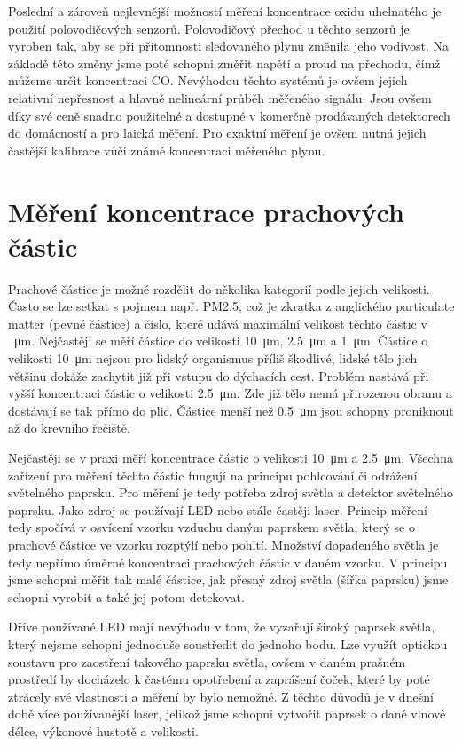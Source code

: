 Poslední a zároveň nejlevnější možností měření koncentrace oxidu uhelnatého je použití polovodičových senzorů. Polovodičový přechod u těchto senzorů je vyroben tak, aby se při přítomnosti sledovaného plynu změnila jeho vodivost. Na základě této změny jsme poté schopni změřit napětí a proud na přechodu, čímž můžeme určit koncentraci CO. Nevýhodou těchto systémů je ovšem jejich relativní nepřesnost a hlavně nelineární průběh měřeného signálu. Jsou ovšem díky své ceně snadno použitelné a dostupné v komerčně prodávaných detektorech do domácností a pro laická měření. Pro exaktní měření je ovšem nutná jejich častější kalibrace vůči známé koncentraci měřeného plynu.

\section{Měření koncentrace prachových částic}

Prachové částice je možné rozdělit do několika kategorií podle jejich velikosti. Často se lze setkat s pojmem např. PM2.5, což je zkratka z anglického particulate matter (pevné částice) a číslo, které udává maximální velikost těchto částic v \SI{}{\micro\metre}. Nejčastěji se měří částice do velikosti \SI{10}{\micro\metre}, \SI{2,5}{\micro\metre} a \SI{1}{\micro\metre}. Částice o velikosti \SI{10}{\micro\metre} nejsou pro lidský organismus příliš škodlivé, lidské tělo jich většinu dokáže zachytit již při vstupu do dýchacích cest. Problém nastává při vyšší koncentraci částic o velikosti \SI{2,5}{\micro\metre}. Zde již tělo nemá přirozenou obranu a dostávají se tak přímo do plic. Částice menší než \SI{0,5}{\micro\metre} jsou schopny proniknout až do krevního řečiště.

Nejčastěji se v praxi měří koncentrace částic o velikosti \SI{10}{\micro\metre} a \SI{2,5}{\micro\metre}. Všechna zařízení pro měření těchto částic fungují na principu pohlcování či odrážení světelného paprsku. Pro měření je tedy potřeba zdroj světla a detektor světelného paprsku. Jako zdroj se používají LED nebo stále častěji laser. Princip měření tedy spočívá v osvícení vzorku vzduchu daným paprskem světla, který se o prachové částice ve vzorku rozptýlí nebo pohltí. Množství dopadeného světla je tedy nepřímo úměrné koncentraci prachových částic v daném vzorku. V principu jsme schopni měřit tak malé částice, jak přesný zdroj světla (šířka paprsku) jsme schopni vyrobit a také jej potom detekovat.

Dříve používané LED mají nevýhodu v tom, že vyzařují široký paprsek světla, který nejsme schopni jednoduše soustředit do jednoho bodu. Lze využít optickou soustavu pro zaostření takového paprsku světla, ovšem v daném prašném prostředí by docházelo k častému opotřebení a zaprášení čoček, které by poté ztrácely své vlastnosti a měření by bylo nemožné. Z těchto důvodů je v dnešní době více používanější laser, jelikož jsme schopni vytvořit paprsek o dané vlnové délce, výkonové hustotě a velikosti. 

